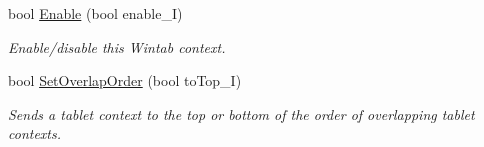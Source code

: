 \begin{DoxyCompactItemize}
bool \hyperlink{class_wintab_d_n_1_1_c_wintab_context_ae65d8671e9a0d79edb51ff47a55e52c4}{Enable} (bool enable\_\-I)
\begin{DoxyCompactList}\small\item\em Enable/disable this Wintab context. \item\end{DoxyCompactList}\item 
bool \hyperlink{class_wintab_d_n_1_1_c_wintab_context_a5aafd039d3811a4e3c6452334a6955ab}{SetOverlapOrder} (bool toTop\_\-I)
\begin{DoxyCompactList}\small\item\em Sends a tablet context to the top or bottom of the order of overlapping tablet contexts. \item\end{DoxyCompactList}\end{DoxyCompactItemize}
